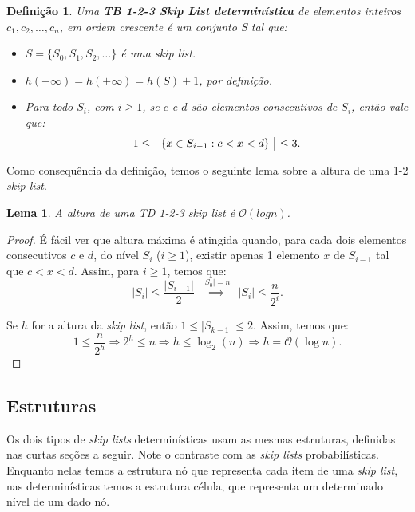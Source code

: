 \documentclass[paper=a4, fontsize=11pt]{scrartcl} %
\newtheorem{definition}{Definição}
\newtheorem{lemma}[theorem]{Lema}
\numberwithin{equation}{section}
\numberwithin{figure}{section}
\numberwithin{table}{section}
\numberwithin{definition}{section}
\numberwithin{theorem}{section}
\numberwithin{property}{section}
\numberwithin{proposition}{section}
\newcommand{\cO}{\ensuremath{\mathcal{O}}}
\newcommand{\sls}{\textit{skip lists}\xspace}
\renewcommand{\sl}{\textit{skip list}\xspace}
\begin{document}
\begin{definition}
Uma \textbf{TB 1-2-3 \emph{Skip List} determinística} de elementos inteiros $c_1, c_2, \ldots, c_n$, 
em ordem crescente é um conjunto S tal que:

\begin{itemize}

\item $S = \{S_0, S_1, S_2, \ldots \}$ é uma \sl.

\item $h(-\infty) = h(+\infty) = h(S) + 1$, por definição.

\item Para todo $S_i$, com $i \geq 1$, se $c$ e $d$ são elementos consecutivos de $S_i$, então vale que:
$$
1 \leq \ \bigm| \{ x \in S_{i -1} : c < x < d \}  \bigm| \ \leq 3.
$$

\end{itemize}

\end{definition}

Como consequência da definição, temos o seguinte lema sobre a altura de uma 1-2 \sl.

\begin{lemma}
A altura de uma TD 1-2-3 \sl é $\cO(log n)$.
\end{lemma}

\begin{proof}
É fácil ver que altura máxima é atingida quando, para cada dois elementos 
consecutivos $c$ e $d$, do nível $S_i$ ($i \geq 1$), existir apenas 1 elemento $x$ de $S_{i-1}$ 
tal que $c < x < d$. Assim, para $ i \geq 1 $, temos que:
$$
|S_i| \leq \frac{|S_{i-1}|}{2} \ \ \overset{|S_0| = n}\implies \ \ |S_i| \leq \frac{n}{2^i}.
$$

Se $h$ for a altura da \sl, então $1 \leq |S_{k-1}| \leq 2$. Assim, temos que:
$$
1 \leq \frac{n}{2^h} \Rightarrow 2^h \leq n \Rightarrow h \leq \log_2(n) \Rightarrow h = \cO(\log n). 
$$
\end{proof}


\subsection{Estruturas}

Os dois tipos de \sls determinísticas usam as mesmas estruturas, definidas nas curtas seções a seguir.
Note o contraste com as \sls probabilísticas. Enquanto nelas temos a estrutura nó que representa
cada item de uma \sl, nas determinísticas temos a estrutura célula, que representa um determinado 
nível de um dado nó.
\end{document}
